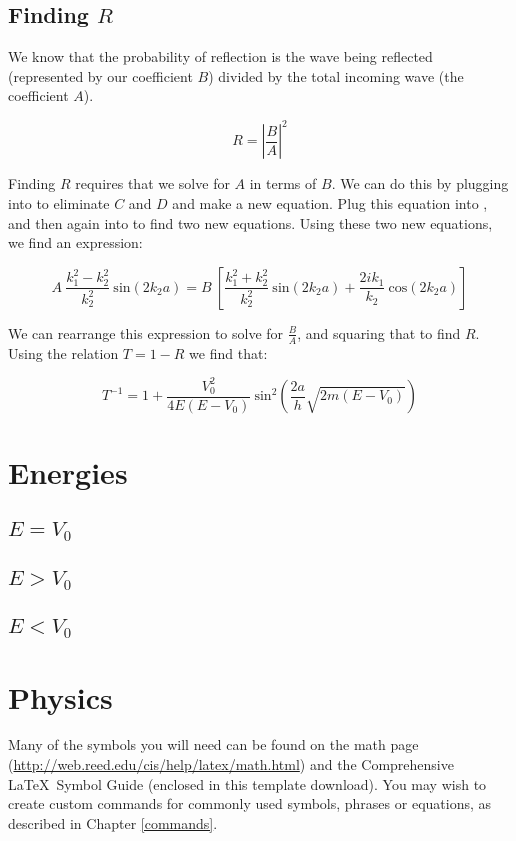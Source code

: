 \subsection{Finding $R$}

We know that the probability of reflection is the wave being reflected (represented by our coefficient $B$) divided by the total incoming wave (the coefficient $A$).

$$R = \left|\frac{B}{A}\right|^2$$

Finding $R$ requires that we solve for $A$ in terms of $B$. We can do this by plugging  into  to eliminate $C$ and $D$ and make a new equation. Plug this equation into , and then again into  to find two new equations. Using these two new equations, we find an expression: 

$$ A~\frac{k_1^2-k_2^2}{k_2^2}~\mathrm{sin}(2k_2a) = B~\left[\frac{k_1^2+k_2^2}{k_2^2}~\mathrm{sin}(2k_2a) + \frac{2 i k_1}{k_2}~\mathrm{cos}(2k_2a)\right]$$

We can rearrange this expression to solve for $\frac{B}{A}$, and squaring that to find $R$. Using the relation $T = 1 - R$ we find that:

\begin{equation}
T^{-1} = 1 + \frac{V_0^2}{4 E (E - V_0)}~\mathrm{sin}^2\left(\frac{2 a}{h} \sqrt{2 m (E - V_0)}\right)
\end{equation}

\section{Energies}
    \subsection{$E = V_0$}
    \subsection{$E > V_0$}
    \subsection{$E < V_0$}
    
    
    
    
\section{Physics}

Many of the symbols you will need can be found on the math page (\url{http://web.reed.edu/cis/help/latex/math.html}) and the Comprehensive \LaTeX\ Symbol Guide (enclosed in this template download).  You may wish to create custom commands for commonly used symbols, phrases or equations, as described in Chapter \ref{commands}.
